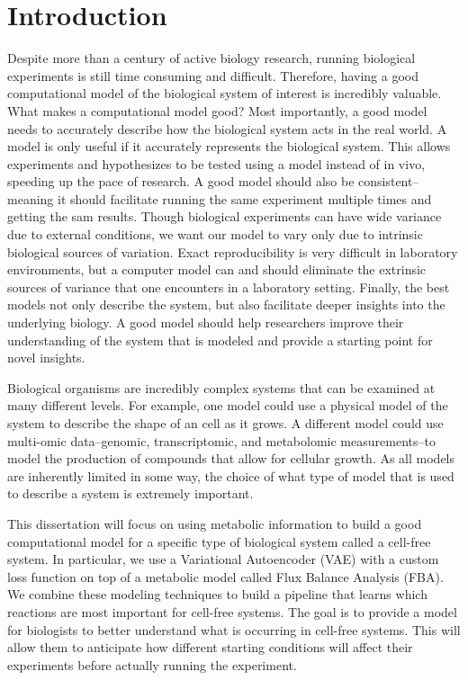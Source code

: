 \chapter{Introduction}
\setcounter{page}{1} 

Despite more than a century of active biology research, running biological experiments is still time consuming and difficult.
Therefore, having a good computational model of the biological system of interest is incredibly valuable.
What makes a computational model good?
Most importantly, a good model needs to accurately describe how the biological system acts in the real world.
A model is only useful if it accurately represents the biological system.
This allows experiments and hypothesizes to be tested using a model instead of in vivo, speeding up the pace of research.
A good model should also be consistent--meaning it should facilitate running the same experiment multiple times and getting the sam results.
Though biological experiments can have wide variance due to external conditions, we want our model to vary only due to intrinsic biological sources of variation.
Exact reproducibility is very difficult in laboratory environments, but a computer model can and should eliminate the extrinsic sources of variance that one encounters in a laboratory setting.
Finally, the best models not only describe the system, but also facilitate deeper insights into the underlying biology.
A good model should help researchers improve their understanding of the system that is modeled and provide a starting point for novel insights.

Biological organisms are incredibly complex systems that can be examined at many different levels.
For example, one model could use a physical model of the system to describe the shape of an cell as it grows.
A different model could use multi-omic data--genomic, transcriptomic, and metabolomic measurements--to model the production of compounds that allow for cellular growth.
As all models are inherently limited in some way, the choice of what type of model that is used to describe a system is extremely important.

This dissertation will focus on using metabolic information to build a good computational model for a specific type of biological system called a cell-free system.
In particular, we use a Variational Autoencoder (VAE) with a custom loss function on top of a metabolic model called Flux Balance Analysis  (FBA).
We combine these modeling techniques to build a pipeline that learns which reactions are most important for cell-free systems.
The goal is to provide a model for biologists to better understand what is occurring in cell-free systems.
This will allow them to anticipate how different starting conditions will affect their experiments before actually running the experiment.

